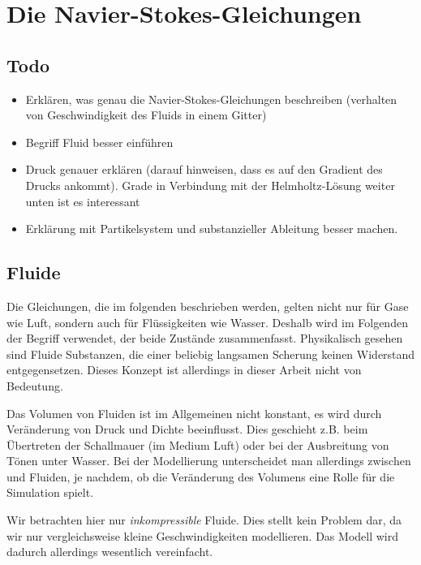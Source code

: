 \section{Die Navier-Stokes-Gleichungen}

\subsection{Todo}

\begin{itemize}
\item
	Erklären, was genau die Navier-Stokes-Gleichungen beschreiben (verhalten
	von Geschwindigkeit des Fluids in einem Gitter)
\item
	Begriff Fluid besser einführen
\item
	Druck genauer erklären (darauf hinweisen, dass es auf den Gradient des
	Drucks ankommt). Grade in Verbindung mit der Helmholtz-Lösung
	weiter unten ist es interessant
\item
	Erklärung mit Partikelsystem und substanzieller Ableitung besser machen.
\end{itemize}

\subsection{Fluide}

Die Gleichungen, die im folgenden beschrieben werden, gelten nicht nur für Gase
wie Luft, sondern auch für Flüssigkeiten wie Wasser. Deshalb wird im Folgenden
der Begriff  verwendet, der beide Zustände zusammenfasst.
Physikalisch gesehen sind Fluide Substanzen, die einer beliebig langsamen
Scherung keinen Widerstand entgegensetzen. Dieses Konzept ist allerdings in
dieser Arbeit nicht von Bedeutung.

Das Volumen von Fluiden ist im Allgemeinen nicht konstant, es wird durch
Veränderung von Druck und Dichte beeinflusst. Dies geschieht z.B. beim
Übertreten der Schallmauer (im Medium Luft) oder bei der Ausbreitung von Tönen
unter Wasser. Bei der Modellierung unterscheidet man allerdings zwischen
 und
 Fluiden, je nachdem, ob die Veränderung
des Volumens eine Rolle für die Simulation spielt.

Wir betrachten hier nur \emph{inkompressible} Fluide. Dies stellt kein Problem dar, da
wir nur vergleichsweise kleine Geschwindigkeiten modellieren. Das Modell wird
dadurch allerdings wesentlich vereinfacht.

